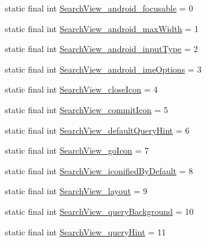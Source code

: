 \begin{DoxyCompactItemize}
\item 
static final int \mbox{\hyperlink{classcom_1_1google_1_1android_1_1gms_1_1R_1_1styleable_a30e529e190c0466004e30ba39033715e}{Search\+View\+\_\+android\+\_\+focusable}} = 0
\item 
static final int \mbox{\hyperlink{classcom_1_1google_1_1android_1_1gms_1_1R_1_1styleable_a04ba0e0e3c40f13401aa7bf7b39aad7a}{Search\+View\+\_\+android\+\_\+max\+Width}} = 1
\item 
static final int \mbox{\hyperlink{classcom_1_1google_1_1android_1_1gms_1_1R_1_1styleable_a1f3c011b2ce557c77db0e0b3ddba7af1}{Search\+View\+\_\+android\+\_\+input\+Type}} = 2
\item 
static final int \mbox{\hyperlink{classcom_1_1google_1_1android_1_1gms_1_1R_1_1styleable_aab997201aa2d228e7b0d6239770c9a8b}{Search\+View\+\_\+android\+\_\+ime\+Options}} = 3
\item 
static final int \mbox{\hyperlink{classcom_1_1google_1_1android_1_1gms_1_1R_1_1styleable_ae148d41c4638fea2013c482ac4cb7874}{Search\+View\+\_\+close\+Icon}} = 4
\item 
static final int \mbox{\hyperlink{classcom_1_1google_1_1android_1_1gms_1_1R_1_1styleable_a5fb7c974f7313a0a4ef9d451eb41610c}{Search\+View\+\_\+commit\+Icon}} = 5
\item 
static final int \mbox{\hyperlink{classcom_1_1google_1_1android_1_1gms_1_1R_1_1styleable_a6676ad1fbeb2a3de0cad1f4baec6cd58}{Search\+View\+\_\+default\+Query\+Hint}} = 6
\item 
static final int \mbox{\hyperlink{classcom_1_1google_1_1android_1_1gms_1_1R_1_1styleable_af140f1786722f7dc71aeadc71fe05639}{Search\+View\+\_\+go\+Icon}} = 7
\item 
static final int \mbox{\hyperlink{classcom_1_1google_1_1android_1_1gms_1_1R_1_1styleable_a1fd56d0a657cc0d7efdad1ecc643d00c}{Search\+View\+\_\+iconified\+By\+Default}} = 8
\item 
static final int \mbox{\hyperlink{classcom_1_1google_1_1android_1_1gms_1_1R_1_1styleable_a95d426edf3f784f68ddd46f526b80211}{Search\+View\+\_\+layout}} = 9
\item 
static final int \mbox{\hyperlink{classcom_1_1google_1_1android_1_1gms_1_1R_1_1styleable_aada3a47fb478919c5a14a54a629e4047}{Search\+View\+\_\+query\+Background}} = 10
\item 
static final int \mbox{\hyperlink{classcom_1_1google_1_1android_1_1gms_1_1R_1_1styleable_a5f68c19fb3c32af87f7a1c44a4939a8e}{Search\+View\+\_\+query\+Hint}} = 11
\item 

\end{DoxyCompactItemize}
